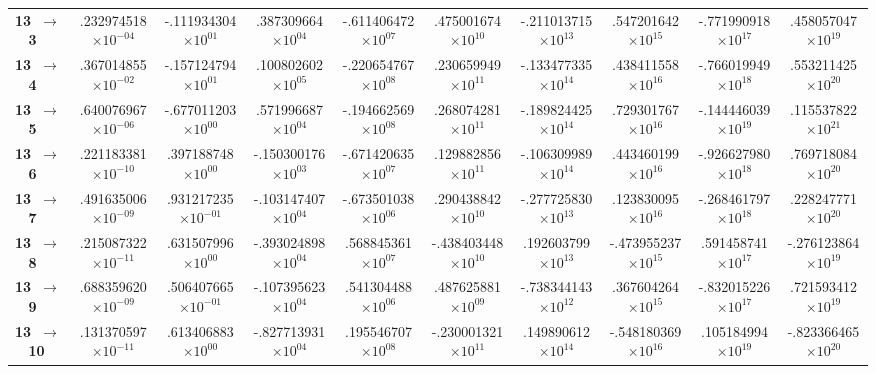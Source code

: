 \documentclass[reviewcopy]{elsarticle}
\begin{document}
\begin{landscape}
\begin{longtable}{lccccccccc}
{\bf 13~$\to$~ 3}   &   .232974518$\times10^{-04}$ & -.111934304$\times10^{ 01}$ &  .387309664$\times10^{ 04}$ & -.611406472$\times10^{ 07}$ &  .475001674$\times10^{ 10}$ & -.211013715$\times10^{ 13}$ &  .547201642$\times10^{ 15}$ & -.771990918$\times10^{ 17}$ &  .458057047$\times10^{ 19}$ \\
{\bf 13~$\to$~ 4}   &   .367014855$\times10^{-02}$ & -.157124794$\times10^{ 01}$ &  .100802602$\times10^{ 05}$ & -.220654767$\times10^{ 08}$ &  .230659949$\times10^{ 11}$ & -.133477335$\times10^{ 14}$ &  .438411558$\times10^{ 16}$ & -.766019949$\times10^{ 18}$ &  .553211425$\times10^{ 20}$ \\
{\bf 13~$\to$~ 5}   &   .640076967$\times10^{-06}$ & -.677011203$\times10^{ 00}$ &  .571996687$\times10^{ 04}$ & -.194662569$\times10^{ 08}$ &  .268074281$\times10^{ 11}$ & -.189824425$\times10^{ 14}$ &  .729301767$\times10^{ 16}$ & -.144446039$\times10^{ 19}$ &  .115537822$\times10^{ 21}$ \\
{\bf 13~$\to$~ 6}   &   .221183381$\times10^{-10}$ &  .397188748$\times10^{ 00}$ & -.150300176$\times10^{ 03}$ & -.671420635$\times10^{ 07}$ &  .129882856$\times10^{ 11}$ & -.106309989$\times10^{ 14}$ &  .443460199$\times10^{ 16}$ & -.926627980$\times10^{ 18}$ &  .769718084$\times10^{ 20}$ \\
{\bf 13~$\to$~ 7}   &   .491635006$\times10^{-09}$ &  .931217235$\times10^{-01}$ & -.103147407$\times10^{ 04}$ & -.673501038$\times10^{ 06}$ &  .290438842$\times10^{ 10}$ & -.277725830$\times10^{ 13}$ &  .123830095$\times10^{ 16}$ & -.268461797$\times10^{ 18}$ &  .228247771$\times10^{ 20}$ \\
{\bf 13~$\to$~ 8}   &   .215087322$\times10^{-11}$ &  .631507996$\times10^{ 00}$ & -.393024898$\times10^{ 04}$ &  .568845361$\times10^{ 07}$ & -.438403448$\times10^{ 10}$ &  .192603799$\times10^{ 13}$ & -.473955237$\times10^{ 15}$ &  .591458741$\times10^{ 17}$ & -.276123864$\times10^{ 19}$ \\
{\bf 13~$\to$~ 9}   &   .688359620$\times10^{-09}$ &  .506407665$\times10^{-01}$ & -.107395623$\times10^{ 04}$ &  .541304488$\times10^{ 06}$ &  .487625881$\times10^{ 09}$ & -.738344143$\times10^{ 12}$ &  .367604264$\times10^{ 15}$ & -.832015226$\times10^{ 17}$ &  .721593412$\times10^{ 19}$ \\
{\bf 13~$\to$~ 10}  &   .131370597$\times10^{-11}$ &  .613406883$\times10^{ 00}$ & -.827713931$\times10^{ 04}$ &  .195546707$\times10^{ 08}$ & -.230001321$\times10^{ 11}$ &  .149890612$\times10^{ 14}$ & -.548180369$\times10^{ 16}$ &  .105184994$\times10^{ 19}$ & -.823366465$\times10^{ 20}$ \\

\end{longtable}
\end{landscape}
\end{document}
